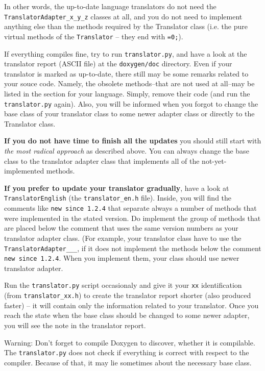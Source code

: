 In other words, the up-to-date language translators do not need the {\tt TranslatorAdapter\_\-x\_\-y\_\-z} classes at all, and you do not need to implement anything else than the methods required by the Translator class (i.e. the pure virtual methods of the {\tt Translator} -- they end with {\tt =0;}).

If everything compiles fine, try to run {\tt translator.py}, and have a look at the translator report (ASCII file) at the {\tt doxygen/doc} directory. Even if your translator is marked as up-to-date, there still may be some remarks related to your souce code. Namely, the obsolete methods--that are not used at all--may be listed in the section for your language. Simply, remove their code (and run the {\tt translator.py} again). Also, you will be informed when you forgot to change the base class of your translator class to some newer adapter class or directly to the Translator class.

{\bf If you do not have time to finish all the updates} you should still start with {\em the most radical approach\/} as described above. You can always change the base class to the translator adapter class that implements all of the not-yet-implemented methods.

{\bf If you prefer to update your translator gradually}, have a look at {\tt TranslatorEnglish} (the {\tt translator\_\-en.h} file). Inside, you will find the comments like {\tt new since 1.2.4} that separate always a number of methods that were implemented in the stated version. Do implement the group of methods that are placed below the comment that uses the same version numbers as your translator adapter class. (For example, your translator class have to use the {\tt TranslatorAdapter\_\_\_}, if it does not implement the methods below the comment {\tt new since 1.2.4}. When you implement them, your class should use newer translator adapter.

Run the {\tt translator.py} script occasionaly and give it your {\tt xx} identification (from {\tt translator\_\-xx.h}) to create the translator report shorter (also produced faster) -- it will contain only the information related to your translator. Once you reach the state when the base class should be changed to some newer adapter, you will see the note in the translator report.

Warning: Don't forget to compile Doxygen to discover, whether it is compilable. The {\tt translator.py} does not check if everything is correct with respect to the compiler. Because of that, it may lie sometimes about the necessary base class.

